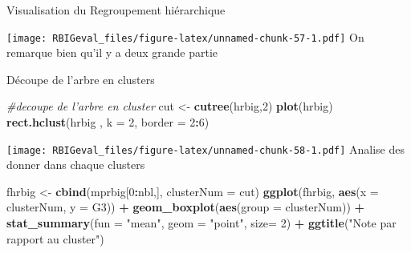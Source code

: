 \documentclass[
]{article}
\newenvironment{Shaded}{\begin{snugshade}}{\end{snugshade}}
\newcommand{\CommentTok}[1]{\textcolor[rgb]{0.56,0.35,0.01}{\textit{#1}}}
\newcommand{\DataTypeTok}[1]{\textcolor[rgb]{0.13,0.29,0.53}{#1}}
\newcommand{\DecValTok}[1]{\textcolor[rgb]{0.00,0.00,0.81}{#1}}
\newcommand{\KeywordTok}[1]{\textcolor[rgb]{0.13,0.29,0.53}{\textbf{#1}}}
\newcommand{\NormalTok}[1]{#1}
\newcommand{\OperatorTok}[1]{\textcolor[rgb]{0.81,0.36,0.00}{\textbf{#1}}}
\newcommand{\StringTok}[1]{\textcolor[rgb]{0.31,0.60,0.02}{#1}}
\begin{document}
Visualisation du Regroupement hiérarchique

\begin{Shaded}
\end{Shaded}

\texttt{[image: RBIGeval\_files/figure-latex/unnamed-chunk-57-1.pdf]} On
remarque bien qu'il y a deux grande partie

Découpe de l'arbre en clusters

\begin{Shaded}
\begin{Highlighting}[]
\CommentTok{#decoupe de l'arbre en cluster}
\NormalTok{cut <-}\StringTok{ }\KeywordTok{cutree}\NormalTok{(hrbig,}\DecValTok{2}\NormalTok{)}
\KeywordTok{plot}\NormalTok{(hrbig)}
\KeywordTok{rect.hclust}\NormalTok{(hrbig , }\DataTypeTok{k =} \DecValTok{2}\NormalTok{, }\DataTypeTok{border =} \DecValTok{2}\OperatorTok{:}\DecValTok{6}\NormalTok{)}
\end{Highlighting}
\end{Shaded}

\texttt{[image: RBIGeval\_files/figure-latex/unnamed-chunk-58-1.pdf]}
Analise des donner dans chaque clusters

\begin{Shaded}
\begin{Highlighting}[]
\NormalTok{fhrbig <-}\StringTok{ }\KeywordTok{cbind}\NormalTok{(mprbig[}\DecValTok{0}\OperatorTok{:}\NormalTok{nbl,], }\DataTypeTok{clusterNum =}\NormalTok{ cut)}
\KeywordTok{ggplot}\NormalTok{(fhrbig, }\KeywordTok{aes}\NormalTok{(}\DataTypeTok{x =}\NormalTok{ clusterNum, }\DataTypeTok{y =}\NormalTok{ G3)) }\OperatorTok{+}\StringTok{ }
\StringTok{  }\KeywordTok{geom_boxplot}\NormalTok{(}\KeywordTok{aes}\NormalTok{(}\DataTypeTok{group =}\NormalTok{ clusterNum)) }\OperatorTok{+}\StringTok{ }
\StringTok{  }\KeywordTok{stat_summary}\NormalTok{(}\DataTypeTok{fun =} \StringTok{"mean"}\NormalTok{, }\DataTypeTok{geom =} \StringTok{"point"}\NormalTok{, }\DataTypeTok{size=} \DecValTok{2}\NormalTok{) }\OperatorTok{+}
\StringTok{  }\KeywordTok{ggtitle}\NormalTok{(}\StringTok{"Note par rapport au cluster"}\NormalTok{)}
\end{Highlighting}
\end{Shaded}
\end{document}
